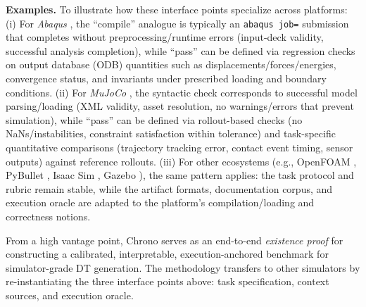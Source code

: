 \textbf{Examples.}
To illustrate how these interface points specialize across platforms:
(i) For \emph{Abaqus} \cite{ABAQUSreference}, the ``compile'' analogue is typically an \texttt{abaqus job=} submission that completes without preprocessing/runtime errors (input-deck validity, successful analysis completion), while ``pass'' can be defined via regression checks on output database (ODB) quantities such as displacements/forces/energies, convergence status, and invariants under prescribed loading and boundary conditions.
(ii) For \emph{MuJoCo} \cite{todorovMujoco2012}, the syntactic check corresponds to successful model parsing/loading (XML validity, asset resolution, no warnings/errors that prevent simulation), while ``pass'' can be defined via rollout-based checks (no NaNs/instabilities, constraint satisfaction within tolerance) and task-specific quantitative comparisons (trajectory tracking error, contact event timing, sensor outputs) against reference rollouts.
(iii) For other ecosystems (e.g., OpenFOAM \cite{openFoam}, PyBullet \cite{Pybullet2023}, Isaac Sim \cite{IssacNvidia2023}, Gazebo \cite{gazebo}), the same pattern applies: the task protocol and rubric remain stable, while the artifact formats, documentation corpus, and execution oracle are adapted to the platform's compilation/loading and correctness notions.

From a high vantage point, Chrono serves as an end-to-end \emph{existence proof} for constructing a calibrated, interpretable, execution-anchored benchmark for simulator-grade DT generation. The methodology transfers to other simulators by re-instantiating the three interface points above: task specification, context sources, and execution oracle.
